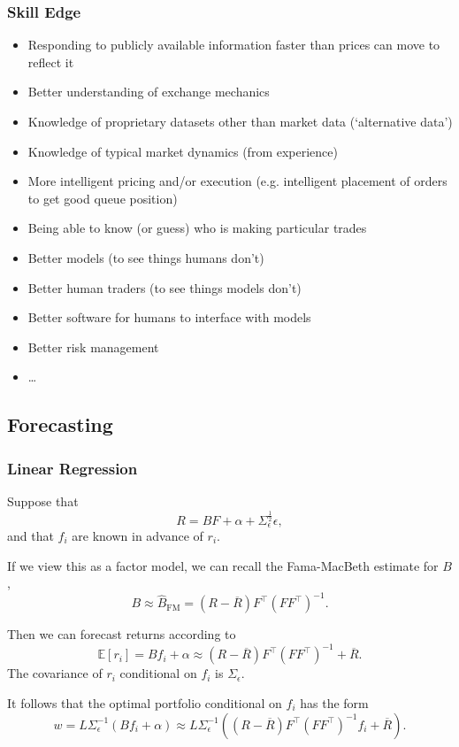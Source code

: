\documentclass{article}
\begin{document}
\subsubsection{Skill Edge}
\begin{itemize}
	\item Responding to publicly available information faster than prices can move to reflect it
	\item Better understanding of exchange mechanics
	\item Knowledge of proprietary datasets other than market data (`alternative data')
	\item Knowledge of typical market dynamics (from experience)
	\item More intelligent pricing and/or execution (e.g. intelligent placement of orders to get good queue position)
	\item Being able to know (or guess) who is making particular trades
	\item Better models (to see things humans don't)
	\item Better human traders (to see things models don't)
	\item Better software for humans to interface with models
	\item Better risk management
	\item \ldots
\end{itemize}

\subsection{Forecasting}
\subsubsection{Linear Regression}
Suppose that	
$$R = B F + \alpha + \Sigma_\epsilon^\frac{1}{2}\epsilon,$$
and that $f_i$ are known in advance of $r_i$.

If we view this as a factor model, we can recall the Fama-MacBeth estimate for $B$,
$$B \approx \hat{B}_{\textrm{FM}} = (R-\overline{R})F^\top (FF^\top)^{-1}.$$

Then we can forecast returns according to
$$\mathbb{E}[r_i] = B f_i + \alpha \approx (R-\overline{R})F^\top (FF^\top)^{-1} + \overline{R}.$$
The covariance of $r_i$ conditional on $f_i$ is $\Sigma_\epsilon$.

It follows that the optimal portfolio conditional on $f_i$ has the form
$$w = L \Sigma_\epsilon^{-1} (B f_i + \alpha) \approx L \Sigma_\epsilon^{-1} ((R-\overline{R})F^\top (FF^\top)^{-1}f_i+\overline{R}).$$%
\end{document}
